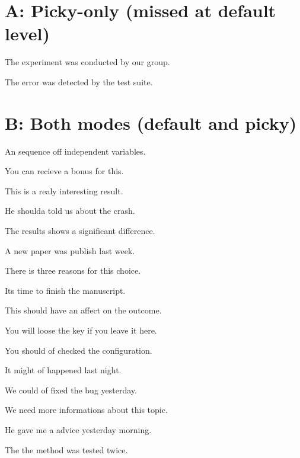 \documentclass{article}
\begin{document}
\section*{A: Picky-only (missed at default level)}

The experiment was conducted by our group.

The error was detected by the test suite.

\section*{B: Both modes (default and picky)}

An sequence off independent variables.

You can recieve a bonus for this.

This is a realy interesting result.

He shoulda told us about the crash.

The results shows a significant difference.

A new paper was publish last week.

There is three reasons for this choice.

Its time to finish the manuscript.

This should have an affect on the outcome.

You will loose the key if you leave it here.

You should of checked the configuration.

It might of happened last night.

We could of fixed the bug yesterday.

We need more informations about this topic.

He gave me a advice yesterday morning.

The the method was tested twice.
\end{document}
